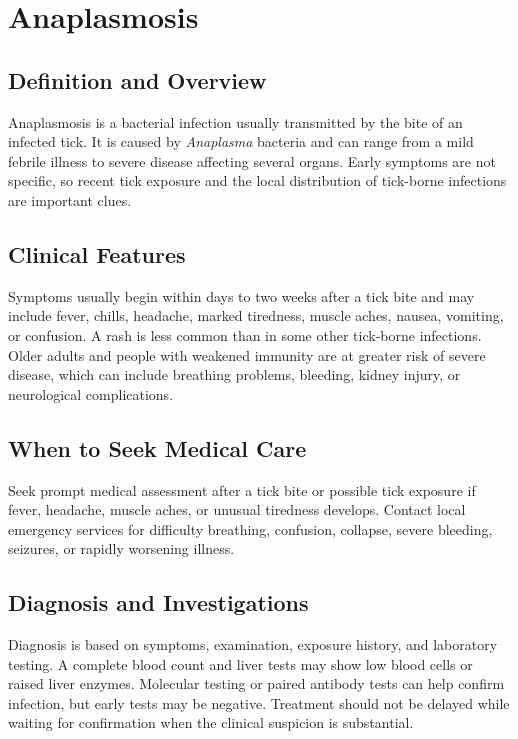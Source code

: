 \chapter{Anaplasmosis}

\section*{Definition and Overview}
Anaplasmosis is a bacterial infection usually transmitted by the bite of an infected tick. It is caused by \textit{Anaplasma} bacteria and can range from a mild febrile illness to severe disease affecting several organs. Early symptoms are not specific, so recent tick exposure and the local distribution of tick-borne infections are important clues.

\section*{Clinical Features}
Symptoms usually begin within days to two weeks after a tick bite and may include fever, chills, headache, marked tiredness, muscle aches, nausea, vomiting, or confusion. A rash is less common than in some other tick-borne infections. Older adults and people with weakened immunity are at greater risk of severe disease, which can include breathing problems, bleeding, kidney injury, or neurological complications.

\section*{When to Seek Medical Care}
Seek prompt medical assessment after a tick bite or possible tick exposure if fever, headache, muscle aches, or unusual tiredness develops. Contact local emergency services for difficulty breathing, confusion, collapse, severe bleeding, seizures, or rapidly worsening illness.

\section*{Diagnosis and Investigations}
Diagnosis is based on symptoms, examination, exposure history, and laboratory testing. A complete blood count and liver tests may show low blood cells or raised liver enzymes. Molecular testing or paired antibody tests can help confirm infection, but early tests may be negative. Treatment should not be delayed while waiting for confirmation when the clinical suspicion is substantial.

